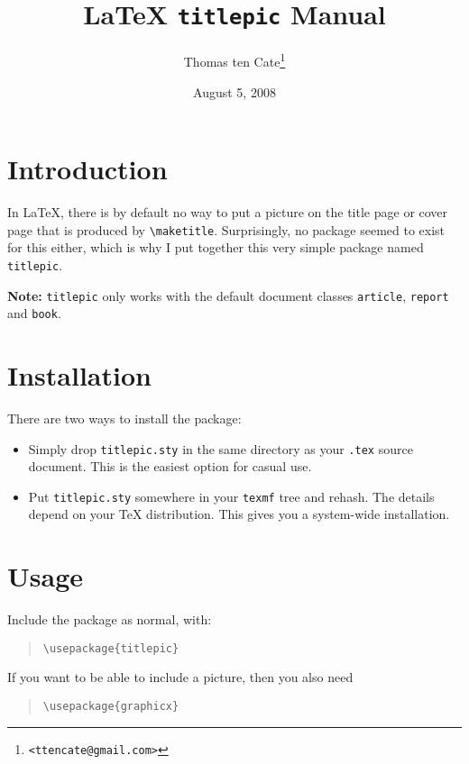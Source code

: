 \documentclass[titlepage]{article}
\title{\LaTeX{} \texttt{titlepic} Manual}
\author{Thomas ten Cate\thanks{\texttt{<ttencate@gmail.com>}}}
\date{August 5, 2008}
\begin{document}
\maketitle

\section{Introduction}

In \LaTeX, there is by default no way to put a picture on the title page or cover page that is produced by \verb$\maketitle$. Surprisingly, no package seemed to exist for this either, which is why I put together this very simple package named \verb$titlepic$.

\textbf{Note:} \verb$titlepic$ only works with the default document classes \verb$article$, \verb$report$ and \verb$book$.

\section{Installation}

There are two ways to install the package:
\begin{itemize}
	\item Simply drop \verb$titlepic.sty$ in the same directory as your \verb$.tex$ source document. This is the easiest option for casual use.
	\item Put \verb$titlepic.sty$ somewhere in your \verb$texmf$ tree and rehash. The details depend on your \TeX{} distribution. This gives you a system-wide installation.
\end{itemize}

\section{Usage}

Include the package as normal, with:

\begin{quote}
	\verb$\usepackage{titlepic}$
\end{quote}

\noindent If you want to be able to include a picture, then you also need

\begin{quote}
	\verb$\usepackage{graphicx}$
\end{quote}
\end{document}
